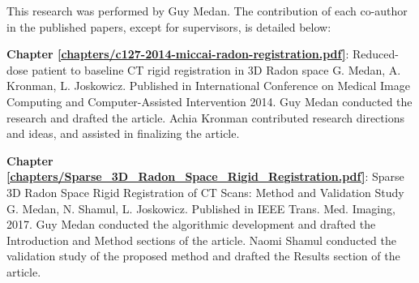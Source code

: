 \cleardoublepage


\begin{contributions}

This research was performed by Guy Medan.  The contribution of each co-author in the published papers, except for supervisors, is detailed below:

\textbf{Chapter \ref{chapters/c127-2014-miccai-radon-registration.pdf}}: Reduced-dose patient to baseline CT rigid registration in 3D Radon space
\newline
G. Medan, A. Kronman, L. Joskowicz. Published in International Conference on Medical Image Computing and Computer-Assisted Intervention 2014.
\newline
Guy Medan conducted the research and drafted the article. Achia Kronman contributed research directions and ideas, and assisted in finalizing the article.

\textbf{Chapter \ref{chapters/Sparse_3D_Radon_Space_Rigid_Registration.pdf}}: Sparse 3D Radon Space Rigid Registration of CT Scans: Method and Validation Study
\newline
G. Medan, N. Shamul, L. Joskowicz. Published in IEEE Trans. Med. Imaging, 2017.
\newline
Guy Medan conducted the algorithmic development and drafted the Introduction and Method sections of the article. Naomi Shamul conducted the validation study of the proposed method and drafted the Results section of the article.

\end{contributions}